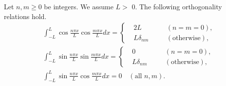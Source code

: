 \begin{theorem} Let $n, m \ge 0$ be integers. We assume $L>$ 0. The following orthogonality relations hold.
    \begin{equation}\label{eq.orthogonality}
        \begin{aligned}
            & \int_{-L}^L \cos \frac{n \pi x}{L} \cos \frac{m \pi x}{L} d x=\left\{
                \begin{aligned}
                &2 L \quad && (n=m=0), 
                \\
                &L \delta_{n m} \quad && (\text{otherwise}),
                \end{aligned}\right. 
            \\
            & \int_{-L}^L \sin \frac{n \pi x}{L} \sin \frac{m \pi x}{L} d x=\left\{
                \begin{aligned}
                &0 \quad &&  (n=m=0), 
                \\
                &L \delta_{n m} \quad &&  (\text {otherwise}),
                \end{aligned}\right. 
            \\
            & \int_{-L}^L \sin \frac{n \pi x}{L} \cos \frac{m \pi x}{L} d x=0 \quad(\text {all } n, m) .
            \end{aligned}
    \end{equation}
\end{theorem}
